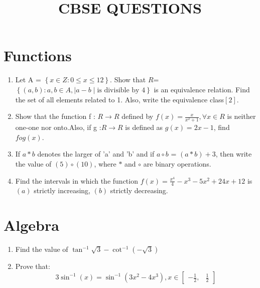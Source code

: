 \documentclass{article}
\providecommand{\sbrak}[1]{\ensuremath{{}\left[#1\right]}}
\providecommand{\brak}[1]{\ensuremath{\left(#1\right)}}
\providecommand{\cbrak}[1]{\ensuremath{\left\{#1\right\}}}
\begin{document}
\title{\textbf{CBSE QUESTIONS}}
\date{}
\maketitle{}
\section{Functions}
\begin{enumerate}
\item Let A = $\cbrak{x \in Z: 0\le x \le 12}$. Show that $R$=$\cbrak{\brak{a,b}: a,b \in A,\mid a-b \mid \text{is divisible by } 4 }$ is an equivalence relation. Find the set of all elements related to 1. Also, write the equivalence class\sbrak 2.
\item Show that the function f : \(R \longrightarrow R\) defined by $f\brak{x} = \frac{x}{x^2 + 1} , \forall x \in R $ is neither one-one nor onto.Also, if g :\(R\longrightarrow R\) is defined as $ g\brak{x} =2x - 1$, find $fog (x)$.
\item If $a \ast b$ denotes the larger of 'a' and 'b' and if $a \circ b$ = $ \brak{a \ast b}+ 3$, then write the value of $ \brak{5} \circ \brak{10} $, where $\ast$ and $\circ$ are binary operations.  
\item Find the intervals in which the function $f\brak{x} =\frac{x^{4}}{4}-x^{3}-5x^{2} + 24x + 12$ is \brak{a} strictly increasing, \brak{b} strictly decreasing.	
\end{enumerate}
\section{Algebra}
\begin{enumerate} 
\item Find the value of $\tan^{-1}\sqrt{3}-\cot^{-1}\brak{-\sqrt{3}}$
\item Prove that:\[3\sin^{-1}\brak{x}=\sin^{-1}\brak{3x^{2}-4x^{3}}, x \in \begin{bmatrix}
	-\frac{1}{2}, & \frac{1}{2}
\end{bmatrix}\]
\end{enumerate}
\end{document}

